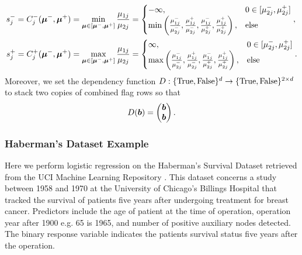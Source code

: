 \documentclass{article}[12pt]
\begin{document}
\begin{align*}
    s_j^- = C_j^-(\boldsymbol{\mu}^-,\boldsymbol{\mu}^+) &= \min_{\boldsymbol{\mu} \in [\boldsymbol{\mu}^-,\boldsymbol{\mu}^+]} \frac{\mu_{1j}}{\mu_{2j}} = 
    \begin{cases}
        -\infty, & 0 \in [\mu_{2j}^-,\mu_{2j}^+] \\
        \min\left(\frac{\mu_{1j}^-}{\mu_{2j}^-},\frac{\mu_{1j}^+}{\mu_{2j}^-},\frac{\mu_{1j}^-}{\mu_{2j}^+},\frac{\mu_{1j}^+}{\mu_{2j}^+}\right), & \text{else}
    \end{cases}, \\
    s_j^+ = C_j^+(\boldsymbol{\mu}^-,\boldsymbol{\mu}^+) &= \max_{\boldsymbol{\mu} \in [\boldsymbol{\mu}^-,\boldsymbol{\mu}^+]} \frac{\mu_{1j}}{\mu_{2j}} =
    \begin{cases}
        \infty, & 0 \in [\mu_{2j}^-,\mu_{2j}^+] \\
         \max\left(\frac{\mu_{1j}^-}{\mu_{2j}^-},\frac{\mu_{1j}^+}{\mu_{2j}^-},\frac{\mu_{1j}^-}{\mu_{2j}^+},\frac{\mu_{1j}^+}{\mu_{2j}^+}\right), & \text{else}
    \end{cases}.
\end{align*}
Moreover, we set the dependency function $D: \{\text{True},\text{False}\}^d \to \{\text{True},\text{False}\}^{2 \times d}$ to stack two copies of combined flag rows so that 
\begin{equation*}
    D(\boldsymbol{b}) =  \begin{pmatrix} \boldsymbol{b} \\ \boldsymbol{b} \end{pmatrix}.
\end{equation*}

\subsubsection{Haberman's Dataset Example}

Here we perform logistic regression on the Haberman's Survival Dataset retrieved from the UCI Machine Learning Repository \cite{uci_ml_repo}. This dataset concerns a study between 1958 and 1970 at the University of Chicago's Billings Hospital that tracked the survival of patients five years after undergoing treatment for breast cancer. Predictors include the age of patient at the time of operation, operation year after 1900 e.g. 65 is 1965, and number of positive auxiliary nodes detected. The binary response variable indicates the patients survival status five years after the operation. 
\end{document}
